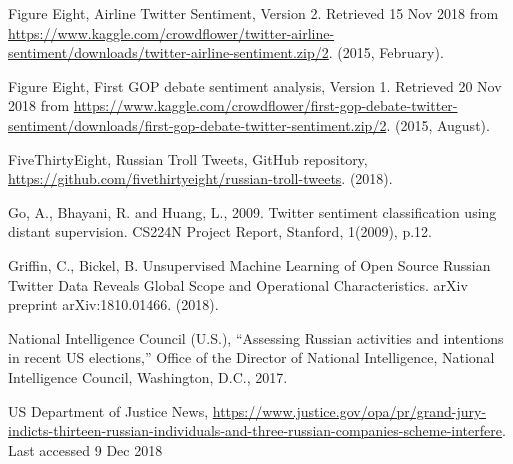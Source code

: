 \documentclass[runningheads]{llncs}
\begin{document}
%
%
%
% 
% 
%
\begin{thebibliography}{8}

Figure Eight, Airline Twitter Sentiment, Version 2. Retrieved 15 Nov 2018 from \url{https://www.kaggle.com/crowdflower/twitter-airline-sentiment/downloads/twitter-airline-sentiment.zip/2}. (2015, February).

Figure Eight, First GOP debate sentiment analysis, Version 1. Retrieved 20 Nov 2018 from \url{https://www.kaggle.com/crowdflower/first-gop-debate-twitter-sentiment/downloads/first-gop-debate-twitter-sentiment.zip/2}. (2015, August).

FiveThirtyEight, Russian Troll Tweets, GitHub repository, \url{https://github.com/fivethirtyeight/russian-troll-tweets}. (2018).


Go, A., Bhayani, R. and Huang, L., 2009. Twitter sentiment classification using distant supervision. CS224N Project Report, Stanford, 1(2009), p.12.

Griffin, C., Bickel, B. Unsupervised Machine Learning of Open Source Russian Twitter Data Reveals Global Scope and Operational Characteristics. arXiv preprint arXiv:1810.01466. (2018).

National Intelligence Council (U.S.), “Assessing Russian activities and intentions in recent US elections,” Office of the Director of National Intelligence, National Intelligence Council, Washington, D.C., 2017.

US Department of Justice News, \url{https://www.justice.gov/opa/pr/grand-jury-indicts-thirteen-russian-individuals-and-three-russian-companies-scheme-interfere}. Last accessed 9 Dec 2018





\end{thebibliography}
\end{document}
